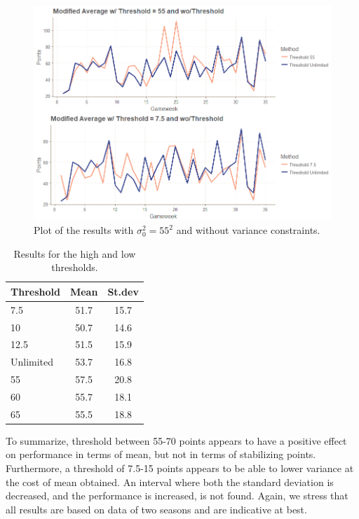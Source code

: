 \begin{figure}[H]
    \centering
    \includegraphics[scale=0.5]{fig/chapter_7/var_threshold.png}
    \caption{Plot of the results with $\sigma_0^{2} = 55^2$ and without variance constraints.}
\label{fig:performance_different_threshold}    
\end{figure}%
\newpar



\begin{table}[H]
\centering
\begin{tabular}{@{}lcc@{}}
\toprule
Threshold & Mean & St.dev \\ \midrule
7.5       & 51.7 & 15.7   \\
10        & 50.7 & 14.6   \\        %
12.5      & 51.5 & 15.9   \\
Unlimited & 53.7 & 16.8   \\
55        & 57.5 & 20.8   \\
60        & 55.7 & 18.1   \\
65        & 55.5 & 18.8   \\ \bottomrule 
\end{tabular}
\caption{Results for the high and low thresholds.}
\label{tab_high_low_thresholds}
\end{table}

\newpar

To summarize, threshold between 55-70 points appears to have a positive effect on performance in terms of mean, but not in terms of stabilizing points. Furthermore, a threshold of 7.5-15 points appears to be able to lower variance at the cost of mean obtained. An interval where both the standard deviation is decreased, and the performance is increased, is not found. Again, we stress that all results are based on data of two seasons and are indicative at best.







